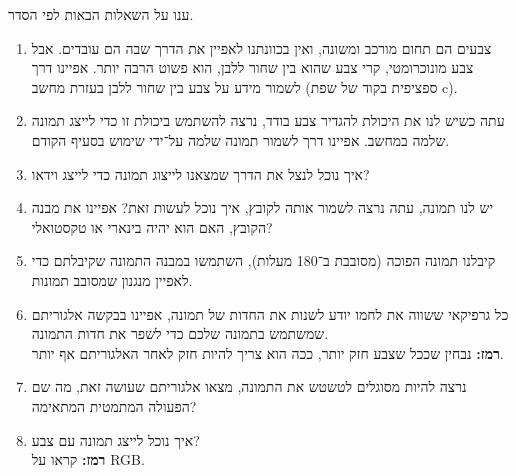 



ענו על השאלות הבאות לפי הסדר.
\begin{enumerate}
	\item צבעים הם תחום מורכב ומשונה, ואין בכוונתנו לאפיין את הדרך שבה הם עובדים.
		אבל צבע מונוכרומטי, קרי צבע שהוא בין שחור ללבן, הוא פשוט הרבה יותר.
		אפיינו דרך לשמור מידע על צבע בין שחור ללבן בעזרת מחשב (ספציפית בקוד של שפת c).
	\item עתה כשיש לנו את היכולת להגדיר צבע בודד, נרצה להשתמש ביכולת זו כדי לייצג תמונה שלמה במחשב.
		אפיינו דרך לשמור תמונה שלמה על־ידי שימוש בסעיף הקודם.
	\item איך נוכל לנצל את הדרך שמצאנו לייצוג תמונה כדי לייצג וידאו?
	\item יש לנו תמונה, עתה נרצה לשמור אותה לקובץ, איך נוכל לעשות זאת?
		אפיינו את מבנה הקובץ, האם הוא יהיה בינארי או טקסטואלי?
	\item קיבלנו תמונה הפוכה (מסובבת ב־180 מעלות), השתמשו במבנה התמונה שקיבלתם כדי לאפיין מנגנון שמסובב תמונות.
	\item כל גרפיקאי ששווה את לחמו יודע לשנות את החדות של תמונה,
		אפיינו בבקשה אלגוריתם שמשתמש בתמונה שלכם כדי לשפר את חדות התמונה. \\
		\textbf{רמז:} נבחין שככל שצבע חזק יותר, ככה הוא צריך להיות חזק לאחר האלגוריתם אף יותר.
	\item נרצה להיות מסוגלים לטשטש את התמונה, מצאו אלגוריתם שעושה זאת, מה שם הפעולה המתמטית המתאימה?
	\item איך נוכל לייצג תמונה עם צבע? \\
		\textbf{רמז:} קראו על RGB\@.
\end{enumerate}


